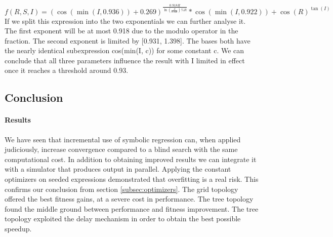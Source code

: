 \[
f(R, S, I) = ({\cos(\min(I,0.936))}+{0.269}) ^ {\frac{0.918 R}{{\ln(\frac{S}{0.349})}\%{R}}} * {\cos(\min(I, 0.922))+{\cos(R)} ^ {\tan(I)} }
\]
If we split this expression into the two exponentials we can further analyse it. The first exponent will be at most 0.918 due to the modulo operator in the fraction. The second exponent is limited by [0.931, 1.398]. The bases both have the nearly identical subexpression cos(min(I, c)) for some constant c. We can conclude that all three parameters influence the result with I limited in effect  once it reaches a threshold around 0.93.
\subsection{Conclusion}
\paragraph{Results}
We have seen that incremental use of symbolic regression can, when applied judiciously, increase convergence compared to a blind search with the same computational cost. In addition to obtaining improved results we can integrate it with a simulator that produces output in parallel. 
Applying the constant optimizers on seeded expressions demonstrated that overfitting is a real risk. This confirms our conclusion from section \ref{subsec:optimizers}.
The grid topology offered the best fitness gains, at a severe cost in performance. The tree topology found the middle ground between performance and fitness improvement. The tree topology exploited the delay mechanism in order to obtain the best possible speedup.

